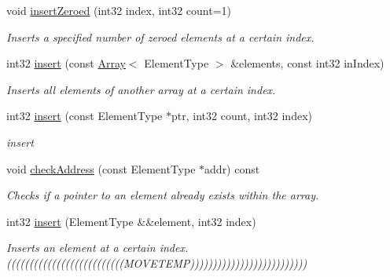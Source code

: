 \begin{DoxyCompactItemize}
void \mbox{\hyperlink{class_arcana_1_1_array_a8b31d0e93b0681aefe579270d16b42ad}{insert\+Zeroed}} (int32 index, int32 count=1)
\begin{DoxyCompactList}\small\item\em Inserts a specified number of zeroed elements at a certain index. \end{DoxyCompactList}\item 
\mbox{\label{class_arcana_1_1_array_a89d53c944322af03d94da36a2e674bd1}} 
int32 \mbox{\hyperlink{class_arcana_1_1_array_a89d53c944322af03d94da36a2e674bd1}{insert}} (const \mbox{\hyperlink{class_arcana_1_1_array}{Array}}$<$ Element\+Type $>$ \&elements, const int32 in\+Index)
\begin{DoxyCompactList}\small\item\em Inserts all elements of another array at a certain index. \end{DoxyCompactList}\item 
\mbox{\label{class_arcana_1_1_array_aa5ecf67f722fac61e4d3bee09754d9e3}} 
int32 \mbox{\hyperlink{class_arcana_1_1_array_aa5ecf67f722fac61e4d3bee09754d9e3}{insert}} (const Element\+Type $\ast$ptr, int32 count, int32 index)
\begin{DoxyCompactList}\small\item\em insert \end{DoxyCompactList}\item 
\mbox{\label{class_arcana_1_1_array_a9d5bfdb7e5b11c1f8639c8515c808bf9}} 
void \mbox{\hyperlink{class_arcana_1_1_array_a9d5bfdb7e5b11c1f8639c8515c808bf9}{check\+Address}} (const Element\+Type $\ast$addr) const
\begin{DoxyCompactList}\small\item\em Checks if a pointer to an element already exists within the array. \end{DoxyCompactList}\item 
\mbox{\label{class_arcana_1_1_array_a11cbb85628be75cbe34b7af08aacb9fd}} 
int32 \mbox{\hyperlink{class_arcana_1_1_array_a11cbb85628be75cbe34b7af08aacb9fd}{insert}} (Element\+Type \&\&element, int32 index)
\begin{DoxyCompactList}\small\item\em Inserts an element at a certain index. ((((((((((((((((((((((((((M\+O\+V\+E\+T\+E\+MP)))))))))))))))))))))))))) \end{DoxyCompactList}\item 

\end{DoxyCompactItemize}
